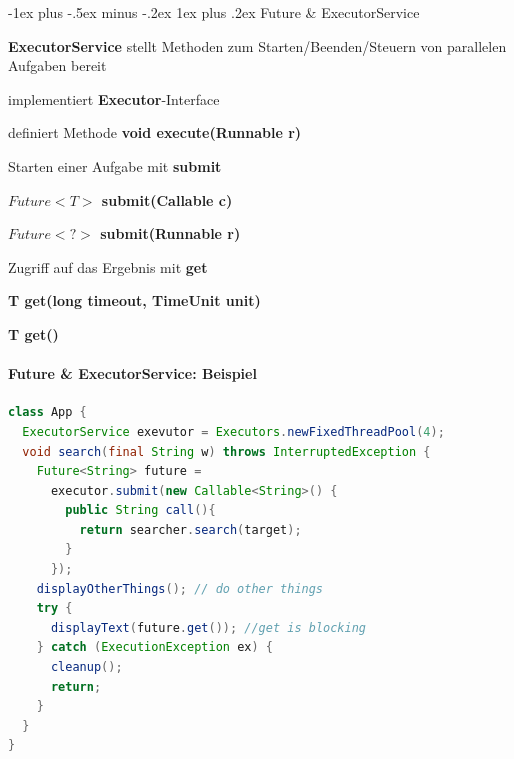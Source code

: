 \documentclass[10pt]{article}
\makeatletter
\renewcommand{\subsubsection}{\@startsection{subsubsection}{3}{0mm}%
                                {-1ex plus -.5ex minus -.2ex}%
                                {1ex plus .2ex}%
                                {\normalfont\small\bfseries}}
\makeatother
\begin{document}
\subsubsection{Future \& ExecutorService}
\begin{itemize*}
  \item \textbf{ExecutorService} stellt Methoden zum Starten/Beenden/Steuern von parallelen Aufgaben bereit
  \item implementiert \textbf{Executor}-Interface
  \begin{itemize*}
    \item definiert Methode \textbf{void execute(Runnable r)}
  \end{itemize*}
  \item Starten einer Aufgabe mit \textbf{submit}
  \begin{itemize*}
    \item \textbf{$Future<T>$ submit(Callable c)}
    \item \textbf{$Future<?>$ submit(Runnable r)}
  \end{itemize*}
  \item Zugriff auf das Ergebnis mit \textbf{get}
  \begin{itemize*}
    \item \textbf{T get(long timeout, TimeUnit unit)}
    \item \textbf{T get()}
  \end{itemize*}
\end{itemize*}

\paragraph{Future \& ExecutorService: Beispiel}
\begin{lstlisting}[language=java]
class App {
  ExecutorService exevutor = Executors.newFixedThreadPool(4);
  void search(final String w) throws InterruptedException {
    Future<String> future = 
      executor.submit(new Callable<String>() {
        public String call(){
          return searcher.search(target);
        }
      });
    displayOtherThings(); // do other things
    try {
      displayText(future.get()); //get is blocking
    } catch (ExecutionException ex) {
      cleanup();
      return;
    }
  }
}
\end{lstlisting}
\end{document}
